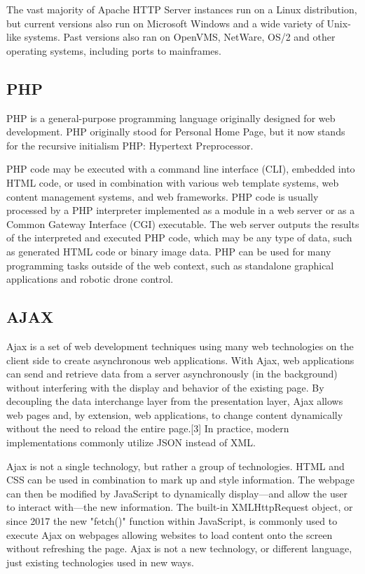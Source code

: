 \documentclass[12pt]{article}
\begin{document}
The vast majority of Apache HTTP Server instances run on a Linux distribution, but current versions also run on Microsoft Windows and a wide variety of Unix-like systems. Past versions also ran on OpenVMS, NetWare, OS/2 and other operating systems, including ports to mainframes.

\subsection{PHP}
PHP is a general-purpose programming language originally designed for web development. PHP originally stood for Personal Home Page,
but it now stands for the recursive initialism PHP: Hypertext Preprocessor.

PHP code may be executed with a command line interface (CLI), embedded into HTML code, or used in combination with various web template systems, web content management systems, and web frameworks. PHP code is usually processed by a PHP interpreter implemented as a module in a web server or as a Common Gateway Interface (CGI) executable. The web server outputs the results of the interpreted and executed PHP code, which may be any type of data, such as generated HTML code or binary image data. PHP can be used for many programming tasks outside of the web context, such as standalone graphical applications and robotic drone control.

\subsection{AJAX}
Ajax is a set of web development techniques using many web technologies on the client side to create asynchronous web applications. With Ajax, web applications can send and retrieve data from a server asynchronously (in the background) without interfering with the display and behavior of the existing page. By decoupling the data interchange layer from the presentation layer, Ajax allows web pages and, by extension, web applications, to change content dynamically without the need to reload the entire page.[3] In practice, modern implementations commonly utilize JSON instead of XML.

Ajax is not a single technology, but rather a group of technologies. HTML and CSS can be used in combination to mark up and style information. The webpage can then be modified by JavaScript to dynamically display—and allow the user to interact with—the new information. The built-in XMLHttpRequest object, or since 2017 the new "fetch()" function within JavaScript, is commonly used to execute Ajax on webpages allowing websites to load content onto the screen without refreshing the page. Ajax is not a new technology, or different language, just existing technologies used in new ways.
\end{document}
